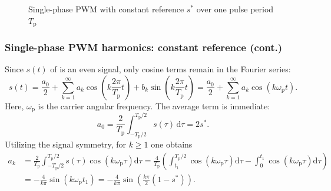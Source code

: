 \begin{frame}
\begin{figure}
        \caption{Single-phase PWM with constant reference $s^*$ over one pulse period $T_\mathrm{p}$}
        \label{fig:single_phase_PWM_with_constant_reference_harmonics}
    \end{figure}

\end{frame}

\begin{frame}
    \frametitle{Single-phase PWM harmonics: constant reference (cont.)}
    Since $s(t)$ of  is an even signal, only cosine terms remain in the Fourier series:
    \[
        s(t)=\frac{a_0}{2}+\sum_{k=1}^{\infty}a_k\cos\!\left(k\frac{2\pi}{T_\mathrm{p}}t\right) + b_k\sin\!\left(k\frac{2\pi}{T_\mathrm{p}}t\right)=\frac{a_0}{2}+\sum_{k=1}^{\infty}a_k\cos\!\left(k\omega_\mathrm{p}t\right).
    \]
    Here, $\omega_\mathrm{p}$ is the carrier angular frequency. The average term is immediate:
    \[
        a_0=\frac{2}{T_\mathrm{p}}\int_{-T_\mathrm{p}/2}^{T_\mathrm{p}/2}s(\tau)\,\mathrm{d}\tau=2s^*.
    \]
    Utilizing the signal symmetry, for $k\geq 1$ one obtains
    \begin{align*}
        a_k
         & =\frac{2}{T_\mathrm{p}}\int_{-T_\mathrm{p}/2}^{T_\mathrm{p}/2}s(\tau)\cos\!\left(k\omega_\mathrm{p}\tau\right)\mathrm{d}\tau
        =\frac{4}{T_\mathrm{p}}\left(\int_{t_1}^{T_\mathrm{p}/2}\cos\!\left(k\omega_\mathrm{p}\tau\right)\mathrm{d}\tau
        -\int_{0}^{t_1}\cos\!\left(k\omega_\mathrm{p}\tau\right)\mathrm{d}\tau\right)                                                   \\
         & =-\frac{4}{k\pi}\sin\!\left(k\omega_\mathrm{p}t_1\right)
        =-\frac{4}{k\pi}\sin\!\left(\frac{k\pi}{2}(1-s^*)\right).
    \end{align*}

\end{frame}

